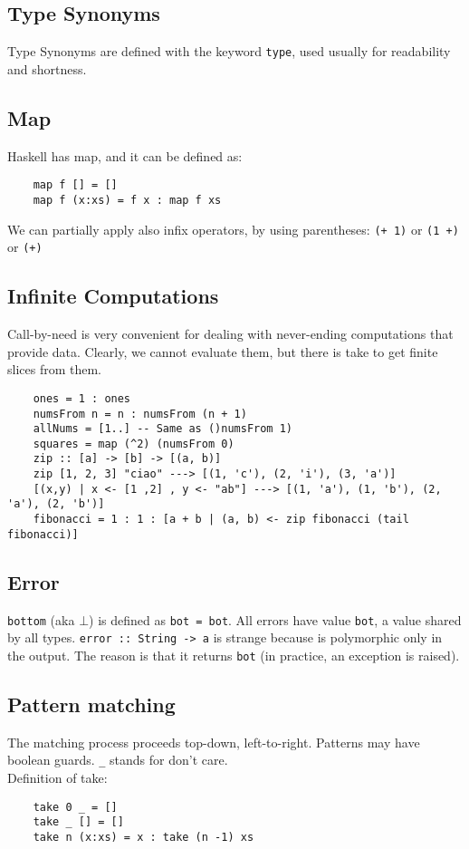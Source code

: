 \subsection{Type Synonyms}
Type Synonyms are defined with the keyword \texttt{type}, used usually for readability and shortness.

\subsection{Map}
Haskell has map, and it can be defined as:
\begin{lstlisting}
	map f [] = []
	map f (x:xs) = f x : map f xs
\end{lstlisting}
We can partially apply also infix operators, by using parentheses: \texttt{(+ 1)} or \texttt{(1 +)} or \texttt{(+)}

\subsection{Infinite Computations}
Call-by-need is very convenient for dealing with never-ending computations that provide data.
Clearly, we cannot evaluate them, but there is take to get finite slices from them.
\begin{lstlisting}
	ones = 1 : ones
	numsFrom n = n : numsFrom (n + 1)
	allNums = [1..] -- Same as ()numsFrom 1)
	squares = map (^2) (numsFrom 0)
	zip :: [a] -> [b] -> [(a, b)]
	zip [1, 2, 3] "ciao" ---> [(1, 'c'), (2, 'i'), (3, 'a')]
	[(x,y) | x <- [1 ,2] , y <- "ab"] ---> [(1, 'a'), (1, 'b'), (2, 'a'), (2, 'b')]
	fibonacci = 1 : 1 : [a + b | (a, b) <- zip fibonacci (tail fibonacci)]
\end{lstlisting}

\subsection{Error}
\texttt{bottom} (aka $\bot$) is defined as \texttt{bot = bot}.
All errors have value \texttt{bot}, a value shared by all types.
\texttt{error :: String -> a} is strange because is polymorphic only in the output.
The reason is that it returns \texttt{bot} (in practice, an exception is raised).

\subsection{Pattern matching}
The matching process proceeds top-down, left-to-right.
Patterns may have boolean guards.
\texttt{\_} stands for don't care.\\
Definition of take:
\begin{lstlisting}
	take 0 _ = []
	take _ [] = []
	take n (x:xs) = x : take (n -1) xs
\end{lstlisting}

